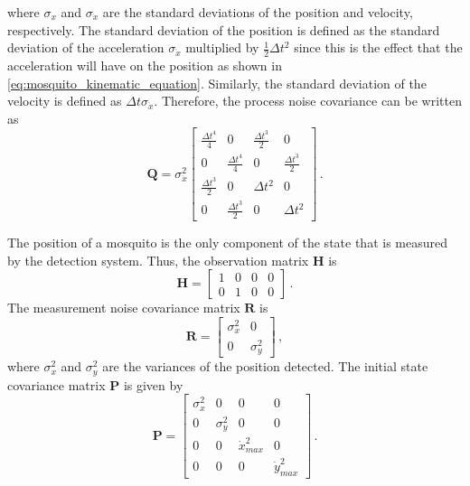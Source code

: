 where $\sigma_{x}$ and $\sigma_{\dot{x}}$ are the standard deviations of the position and velocity, respectively. The standard deviation of the position is defined as the standard deviation of the acceleration $\sigma_{\ddot{x}}$ multiplied by $\frac{1}{2}\Delta t^2$ since this is the effect that the acceleration will have on the position as shown in \autoref{eq:mosquito_kinematic_equation}. Similarly, the standard deviation of the velocity is defined as $\Delta t \sigma_{\ddot{x}}$. Therefore, the process noise covariance can be written as
\begin{equation}
    \mathbf{Q} =
    \sigma_{\ddot{x}}^{2}
    \begin{bmatrix}
        \frac{\Delta t^4}{4} & 0                    & \frac{\Delta t^3}{2} & 0                    \\
        0                    & \frac{\Delta t^4}{4} & 0                    & \frac{\Delta t^3}{2} \\
        \frac{\Delta t^3}{2} & 0                    & \Delta t^2           & 0                    \\
        0                    & \frac{\Delta t^3}{2} & 0                    & \Delta t^2
    \end{bmatrix}\,.
\end{equation}

The position of a mosquito is the only component of the state that is measured by the detection system. Thus, the observation matrix $\mathbf{H}$ is
\begin{equation}
    \mathbf{H} = \begin{bmatrix}
        1 & 0 & 0 & 0 \\
        0 & 1 & 0 & 0
    \end{bmatrix}\,.
\end{equation}
The measurement noise covariance matrix $\mathbf{R}$ is
\begin{equation}
    \mathbf{R} = \begin{bmatrix}
        \sigma_{x}^2 & 0            \\
        0            & \sigma_{y}^2
    \end{bmatrix}\,,
\end{equation}
where $\sigma_{x}^2$ and $\sigma_{y}^2$ are the variances of the position detected. The initial state covariance matrix $\mathbf{P}$ is given by
\begin{equation}
    \mathbf{P} = \begin{bmatrix}
        \sigma_{x}^2 & 0            & 0               & 0               \\
        0            & \sigma_{y}^2 & 0               & 0               \\
        0            & 0            & \dot{x}_{max}^2 & 0               \\
        0            & 0            & 0               & \dot{y}_{max}^2
    \end{bmatrix}\,.
\end{equation}

